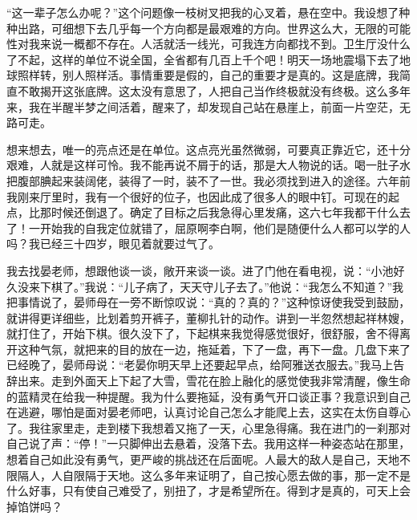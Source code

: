 \documentclass[12pt,oneside]{book}
\begin{document}
``这一辈子怎么办呢？''这个问题像一枝树叉把我的心叉着，悬在空中。我设想了种种出路，可细想下去几乎每一个方向都是最艰难的方向。世界这么大，无限的可能性对我来说一概都不存在。人活就活一线光，可我连方向都找不到。卫生厅没什么了不起，这样的单位不说全国，全省都有几百上千个吧！明天一场地震塌下去了地球照样转，别人照样活。事情重要是假的，自己的重要才是真的。这是底牌，我简直不敢揭开这张底牌。这太没有意思了，人把自己当作终极就没有终极。这么多年来，我在半醒半梦之间活着，醒来了，却发现自己站在悬崖上，前面一片空茫，无路可走。

想来想去，唯一的亮点还是在单位。这点亮光虽然微弱，可要真正靠近它，还十分艰难，人就是这样可怜。我不能再说不屑于的话，那是大人物说的话。喝一肚子水把腹部腆起来装阔佬，装得了一时，装不了一世。我必须找到进入的途径。六年前我刚来厅里时，我有一个很好的位子，也因此成了很多人的眼中钉。可现在的起点，比那时候还倒退了。确定了目标之后我急得心里发痛，这六七年我都干什么去了！一开始我的自我定位就错了，屈原啊李白啊，他们是随便什么人都可以学的人吗？我已经三十四岁，眼见着就要过气了。

我去找晏老师，想跟他谈一谈，敞开来谈一谈。进了门他在看电视，说：``小池好久没来下棋了。''我说：``儿子病了，天天守儿子去了。''他说：``我怎么不知道？''我把事情说了，晏师母在一旁不断惊叹说：``真的？真的？''这种惊讶使我受到鼓励，就讲得更详细些，比划着剪开裤子，董柳扎针的动作。讲到一半忽然想起祥林嫂，就打住了，开始下棋。很久没下了，下起棋来我觉得感觉很好，很舒服，舍不得离开这种气氛，就把来的目的放在一边，拖延着，下了一盘，再下一盘。几盘下来了已经晚了，晏师母说：``老晏你明天早上还要起早点，给阿雅送衣服去。''我马上告辞出来。走到外面天上下起了大雪，雪花在脸上融化的感觉使我非常清醒，像生命的蓝精灵在给我一种提醒。我为什么要拖延，没有勇气开口谈正事？我意识到自己在逃避，哪怕是面对晏老师吧，认真讨论自己怎么才能爬上去，这实在太伤自尊心了。我往家里走，走到楼下我想着又拖了一天，心里急得痛。我在进门的一刹那对自己说了声：``停！''一只脚伸出去悬着，没落下去。我用这样一种姿态站在那里，想着自己如此没有勇气，更严峻的挑战还在后面呢。人最大的敌人是自己，天地不限隔人，人自限隔于天地。这么多年来证明了，自己按心愿去做的事，那一定不是什么好事，只有使自己难受了，别扭了，才是希望所在。得到才是真的，可天上会掉馅饼吗？
\end{document}
